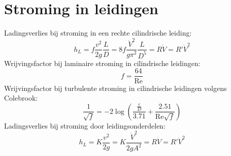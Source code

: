 	\section{Stroming in leidingen}
\begin{multicols}{2}
	Ladingsverlies bij stroming in een rechte cilindrische leiding:
	\begin{equation}
		h_L = f \frac{v^2}{2 g}\frac{L}{D} = 8 f \frac{\dot{V}^2}{g \pi^2}\frac{L}{D^5} = R \dot{V} = R' \dot{V}^2
	\end{equation}
	Wrijvingsfactor bij laminaire stroming in cilindrische leidingen:
	\begin{equation}
		f = \frac{64}{\text{Re}}
	\end{equation}
	Wrijvingsfactor bij turbulente stroming in cilindrische leidingen volgens Colebrook:
	\begin{equation}
		\frac{1}{\sqrt{f}} = -2 \log \left( \frac{\frac{\varepsilon}{D}}{3.71}+\frac{2.51}{\text{Re}\sqrt{f}} \right)
	\end{equation}
	Ladingsverlies bij stroming door leidingsonderdelen:
	\begin{equation}
		h_L = K \frac{v^2}{2 g} = K \frac{\dot{V}^2}{2 g A^2} = R \dot{V} = R' \dot{V}^2
	\end{equation}
\end{multicols}